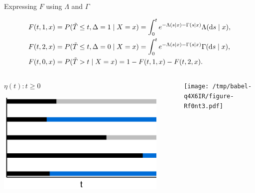 \documentclass[smaller]{beamer}\usepackage{listings}
\begin{document}
\begin{frame}[label={sec:org9a8d04e}]{Expressing \(F\) using \(\Lambda\) and \(\Gamma\)}
\small

\begin{equation*}
\begin{split}
F(t, 1, x)
& = P(\tilde{T} \leq t, \Delta=1 \mid X=x)
  = \int_0^t e^{-\Lambda(s \mid x) - \Gamma(s \mid x) }  \Lambda(\mathop{}\!\mathrm{d} s \mid x),
\\
F(t, 2, x)
& = P(\tilde{T} \leq t, \Delta=0 \mid X=x)
  = \int_0^t e^{-\Lambda(s \mid x) - \Gamma(s \mid x) }  \Gamma(\mathop{}\!\mathrm{d} s \mid x),
\\
F(t, 0, x)
&
  = P(\tilde{T} > t \mid X= x)
  = 1- F(t, 1, x) - F(t, 2, x).
\end{split}
\end{equation*}

\vspace{.5cm}

\begin{columns}
\begin{column}{0.45\columnwidth}
\centering \(\eta(t) : t \geq 0\)

\begin{center}
\includegraphics[width=0.9\textwidth]{./multi-state-data-3.pdf}
\end{center}
\end{column}

\begin{column}{0.5\columnwidth}
\begin{center}
\texttt{[image: /tmp/babel-q4X6IR/figure-Rf0nt3.pdf]}
\end{center}
\end{column}
\end{columns}
\end{frame}
\end{document}
